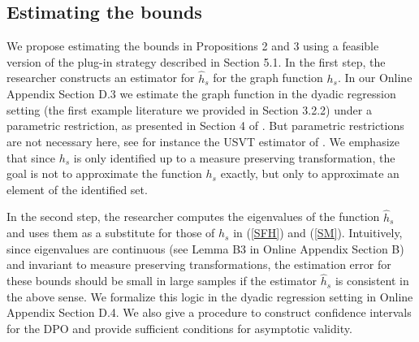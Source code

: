 \documentclass[12pt]{article}
\theoremstyle{definition}
\begin{document}
%



\subsection{Estimating the bounds}
We propose estimating the bounds in Propositions 2 and 3 using a feasible version of the plug-in strategy described in Section 5.1. In the first step, the researcher constructs an estimator for $\hat{h}_s$ for the graph function $h_s$. In our Online Appendix Section D.3 we estimate the graph function in the dyadic regression setting  (the first example literature we provided in Section 3.2.2)  under a parametric restriction, as presented in Section 4 of \cite{graham2020network}. But parametric restrictions are not necessary here, see for instance the USVT estimator of \cite{chatterjee2015matrix}. We emphasize that since $h_s$ is only identified up to a measure preserving transformation, the goal is not to approximate the function $h_s$ exactly, but only to approximate an element of the identified set. 

In the second step, the researcher computes the eigenvalues of the function $\hat{h}_s$ and uses them as a substitute for those of $h_s$ in (\ref{SFH}) and (\ref{SM}). Intuitively, since eigenvalues are continuous (see Lemma B3 in Online Appendix Section B) and invariant to measure preserving transformations, the estimation error for these bounds should be small in large samples if the estimator $\hat{h}_s$ is consistent in the above sense. We formalize this logic in the dyadic regression setting in Online Appendix Section D.4. We also give a procedure to construct confidence intervals for the DPO and provide sufficient conditions for asymptotic validity.  
\end{document}
